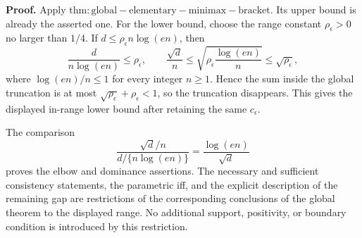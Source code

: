 \textbf{Proof.}
Apply \(\mathrm{thm:global-elementary-minimax-bracket}\).  Its upper bound is already the asserted one.  For the lower bound, choose the range constant \(\rho_\epsilon>0\) no larger than \(1/4\).  If \(d\le\rho_\epsilon n\log(en)\), then
\[
 \frac d{n\log(en)}\le\rho_\epsilon,
 \qquad
 \frac{\sqrt d}{n}
 \le\sqrt{\rho_\epsilon\frac{\log(en)}n}
 \le\sqrt{\rho_\epsilon},
\]
where \(\log(en)/n\le1\) for every integer \(n\ge1\).  Hence the sum inside the global truncation is at most \(\sqrt{\rho_\epsilon}+\rho_\epsilon<1\), so the truncation disappears.  This gives the displayed in-range lower bound after retaining the same \(c_\epsilon\).

The comparison
\[
 \frac{\sqrt d/n}{d/\{n\log(en)\}}
 =\frac{\log(en)}{\sqrt d}
\]
proves the elbow and dominance assertions.  The necessary and sufficient consistency statements, the parametric iff, and the explicit description of the remaining gap are restrictions of the corresponding conclusions of the global theorem to the displayed range.  No additional support, positivity, or boundary condition is introduced by this restriction.